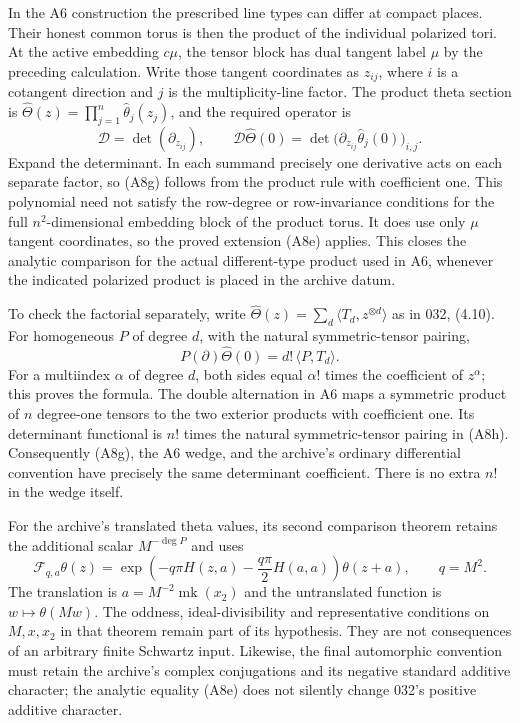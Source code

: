 In the A6 construction the prescribed line types can differ at
compact places.  Their honest common torus is then the product of
the individual polarized tori.  At the active embedding $c\mu$,
the tensor block has dual tangent label $\mu$ by the preceding
calculation.  Write those tangent coordinates as $z_{ij}$, where $i$ is a
cotangent direction and $j$ is the multiplicity-line factor.  The
product theta section is
$\widehat\Theta(z)=\prod_{j=1}^n\widehat\theta_j(z_j)$, and the
required operator is
\[
 \mathcal D=\det(\partial_{z_{ij}}),\qquad
 \mathcal D\widehat\Theta(0)
       =\det\bigl(\partial_{z_{ij}}
                         \widehat\theta_j(0)\bigr)_{i,j}.
 \tag{A8g}
\]
Expand the determinant.  In each summand precisely one derivative
acts on each separate factor, so (A8g) follows from the product
rule with coefficient one.  This polynomial need not satisfy the
row-degree or row-invariance conditions for the full
$n^2$-dimensional embedding block of the product torus.  It does
use only $\mu$ tangent coordinates, so the proved extension (A8e)
applies.  This closes the analytic comparison for the actual
different-type product used in A6, whenever the indicated
polarized product is placed in the archive datum.

To check the factorial separately, write
$\widehat\Theta(z)=\sum_d\langle T_d,z^{\otimes d}\rangle$
as in 032, (4.10).  For homogeneous $P$ of degree $d$, with the
natural symmetric-tensor pairing,
\[
          P(\partial)\widehat\Theta(0)
                 =d!\,\langle P,T_d\rangle.
 \tag{A8h}
\]
For a multiindex $\alpha$ of degree $d$, both sides equal
$\alpha!$ times the coefficient of $z^\alpha$; this proves the
formula.  The double alternation in A6 maps a symmetric product
of $n$ degree-one tensors to the two exterior products with
coefficient one.  Its determinant functional is $n!$ times the
natural symmetric-tensor pairing in (A8h).  Consequently (A8g),
the A6 wedge, and the archive's ordinary differential convention
have precisely the same determinant coefficient.  There is no
extra $n!$ in the wedge itself.

For the archive's translated theta values, its second comparison
theorem retains the additional scalar $M^{-\deg P}$ and uses
\[
 \mathcal F_{q,a}\theta(z)
   =\exp\left(-q\pi H(z,a)-\frac{q\pi}{2}H(a,a)\right)
       \theta(z+a),\qquad q=M^2.
 \tag{A8i}
\]
The translation is $a=M^{-2}\operatorname{mk}(x_2)$ and the
untranslated function is $w\mapsto\theta(Mw)$.  The oddness,
ideal-divisibility and representative conditions on $M,x,x_2$ in
that theorem remain part of its hypothesis.  They are not
consequences of an arbitrary finite Schwartz input.  Likewise,
the final automorphic convention must retain the archive's
complex conjugations and its negative standard additive
character; the analytic equality (A8e) does not silently change
032's positive additive character.

